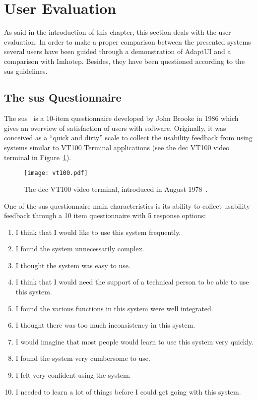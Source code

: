 \section{User Evaluation}
\label{sec:user_evaluation}

As said in the introduction of this chapter, this section deals with the user 
evaluation. In order to make a proper comparison between the presented systems 
several users have been guided through a demonstration of AdaptUI and a 
comparison with Imhotep. Besides, they have been questioned according to the 
\ac{sus} guidelines.

\subsection{The \ac{sus} Questionnaire}
\label{sec:sus}
The \ac{sus}~\citep{sus} is a 10-item questionnaire developed by John Brooke in 
1986 which gives an overview of satisfaction of users with software. Originally, 
it was conceived as a ``quick and dirty'' scale to collect the usability feedback 
from using systems similar to VT100 Terminal applications (see the \ac{dec} VT100 
video terminal in Figure~\ref{fig:vt100}).

\begin{figure}
\centering
\texttt{[image: vt100.pdf]}
\caption{The \ac{dec} VT100 video terminal, introduced in August 1978~\citep{vt100}.}
\label{fig:vt100}
\end{figure}

One of the \ac{sus} questionnaire main characteristics is its ability to collect
usability feedback through a 10 item questionnaire with 5 response options: 

\begin{enumerate}
 \item I think that I would like to use this system frequently.
 \item I found the system unnecessarily complex.
 \item I thought the system was easy to use.
 \item I think that I would need the support of a technical person to be able to
 use this system.
 \item I found the various functions in this system were well integrated.
 \item I thought there was too much inconsistency in this system.
 \item I would imagine that most people would learn to use this system very
 quickly.
 \item I found the system very cumbersome to use.
 \item I felt very confident using the system.
 \item I needed to learn a lot of things before I could get going with this
 system.
\end{enumerate}

